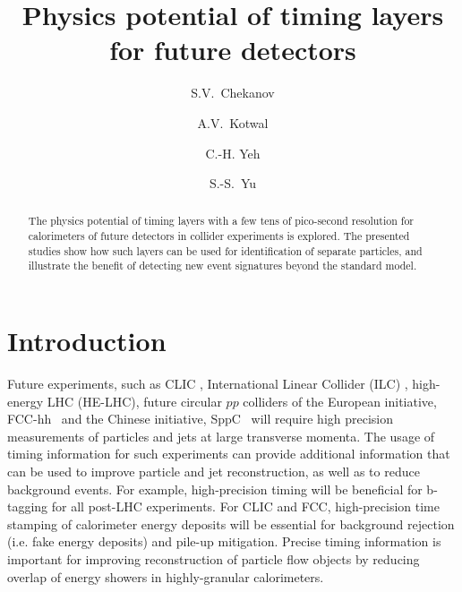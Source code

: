 \documentclass[final,1p,11pt]{elsarticle}
\begin{document}
\begin{frontmatter}

\title{
Physics potential of timing layers for future detectors}

\author[add1]{S.V.~Chekanov}

\author[addDuke]{A.V.~Kotwal}

\author[add3]{C.-H. Yeh}


\author[add3]{S.-S.~Yu}

\address[add1]{
HEP Division, Argonne National Laboratory,
9700 S.~Cass Avenue,
Argonne, IL 60439, USA.
}


\address[add3]{
Department of Physics and Center for High Energy and High Field Physics, 
National Central University, Chung-Li, Taoyuan City 32001, Taiwan
}

\address[addDuke]{
Department of Physics, Duke University, USA
}


\begin{abstract}
The physics potential of timing layers with a few tens of pico-second resolution for 
calorimeters of future detectors in collider experiments is explored.
The presented studies show how such layers can be used for identification 
of separate particles, and  illustrate the benefit of detecting  
new event signatures beyond the standard model. 
\end{abstract}

\begin{keyword}

\end{keyword}
\end{frontmatter}



\section{Introduction}

Future experiments, such as CLIC \cite{Linssen:1425915}, International Linear Collider (ILC) \cite{Behnke:2013xla}, high-energy LHC (HE-LHC),
future circular $pp$ colliders of the European initiative, FCC-hh~\cite{Benedikt:2206376} and the Chinese initiative, SppC~\cite{Tang:2015qga} 
will require high precision measurements of particles and jets 
at large transverse momenta. 
The usage of timing information for such experiments  can  provide additional 
information that can be used to improve particle and jet reconstruction, as well as to reduce background events.
For example, high-precision timing will be beneficial for b-tagging for all post-LHC experiments. 
For CLIC and FCC, high-precision time stamping of calorimeter energy deposits will be essential for
background rejection (i.e. fake energy deposits) and pile-up mitigation.
Precise timing information is important for improving reconstruction of particle flow objects by reducing overlap 
of energy showers in highly-granular calorimeters.
\end{document}
